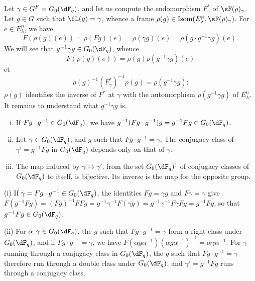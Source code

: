 \subsection{}\label{VI:1-23}

Let $\gamma\in G^F=G_0(\dF_q)$, and let us compute the endomorphism $F^\ast$ of
$\sF(\rho)_\gamma$. Let $g\in G$ such that $\fL(g)=\gamma$, whence a frame
$\rho(g)\in \operatorname{Isom}(E_\lambda^n,\sF(\rho)_\gamma)$. For
$e\in E_\lambda^n$, we have 
\[
  F(\rho(g)(e)) = \rho(F g)(e) = \rho(\gamma g)(e) = \rho(g\cdot g^{-1}\gamma g)(e) \text{.}
\]
We will see that $g^{-1} \gamma g\in G_0(\dF_q)$, whence 
\[
  F(\rho(g)(e)) = \rho(g) \rho(g^{-1}\gamma g)(e)
\]
et 
\begin{equation*}\tag{1.23.1}\label{VI:eq:1-23-1}
  \rho(g)^{-1} (F_\gamma^\ast)^{-1} \rho(g) = \rho(g^{-1} \gamma g) \text{:}
\end{equation*}
$\rho(g)$ identifies the inverse of $F^\ast$ at $\gamma$ with the automorphism
$\rho(g^{-1} \gamma g)$ of $E_\lambda^n$. It remains to understand what
$g^{-1} \gamma g$ is. 





\begin{lemma_}\label{VI:1-24}
\begin{enumerate}[(i)]
  \item If $F g\cdot g^{-1} \in G_0(\dF_q)$, we have
    $g^{-1} (F g\cdot g^{-1}) g = g^{-1} F g\in G_0(\dF_q)$.
  \item Let $\gamma\in G_0(\dF_q)$, and $g$ such that
    $F g\cdot g^{-1} = \gamma$. The conjugacy class of $\gamma'=g^{-1} Fg$
    in $G_0(\dF_q)$ depends only on that of $\gamma$.
  \item The map induced by $\gamma\mapsto \gamma'$, from the set
    $G_0(\dF_q)^\natural$ of conjugacy classes of $G_0(\dF_q)$ to
    itself, is bijective. Its inverse is the map for the opposite
    group.
\end{enumerate}
\end{lemma_}

(i) If $\gamma= F g\cdot g^{-1}\in G_0(\dF_q)$, the identities $F g=\gamma g$
and
$F\gamma=\gamma$ give $F(g^{-1} F g) = (F g)^{-1} F F g = g^{-1} \gamma^{-1} F(\gamma g) = g^{-1} \gamma^{-1} F \gamma F g = g^{-1} F g$,
so that $g^{-1} F g \in G_0(\dF_q)$.

(ii) For $\alpha,\gamma\in G_0(\dF_q)$, the $g$ such that
$F g\cdot g^{-1} = \gamma$ form a right class under $G_0(\dF_q)$, and
if $F g\cdot g^{-1} = \gamma$, we have
$F(\alpha g \alpha^{-1})(\alpha g \alpha^{-1})^{-1} = \alpha \gamma\alpha^{-1}$.
For $\gamma$ running through a conjugacy class in $G_0(\dF_q)$, the $g$
such that $F g\cdot g^{-1} = \gamma$ therefore run through a double class under
$G_0(\dF_q)$, and $\gamma'= g^{-1} F g$ runs through a conjugacy class.

